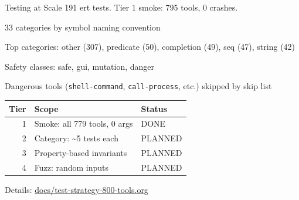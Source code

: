 \documentclass[presentation]{beamer}
\begin{document}
\begin{frame}[label={sec:org8c7a392},fragile]{Testing at Scale}
 191 ert tests. Tier 1 smoke: 795 tools, 0 crashes.
\begin{block}{33 categories by symbol naming convention}
\end{block}
\begin{block}{Top categories: other (307), predicate (50), completion (49), seq (47), string (42)}
\end{block}
\begin{block}{Safety classes: safe, gui, mutation, danger}
\end{block}
\begin{block}{Dangerous tools (\texttt{shell-command}, \texttt{call-process}, etc.) skipped by skip list}
\begin{center}
\begin{tabular}{rll}
Tier & Scope & Status\\
\hline
1 & Smoke: all 779 tools, 0 args & DONE\\
2 & Category: \textasciitilde{}5 tests each & PLANNED\\
3 & Property-based invariants & PLANNED\\
4 & Fuzz: random inputs & PLANNED\\
\end{tabular}
\end{center}

Details: \href{../../test-strategy-800-tools.org}{docs/test-strategy-800-tools.org}
\end{block}
\end{frame}
\end{document}
